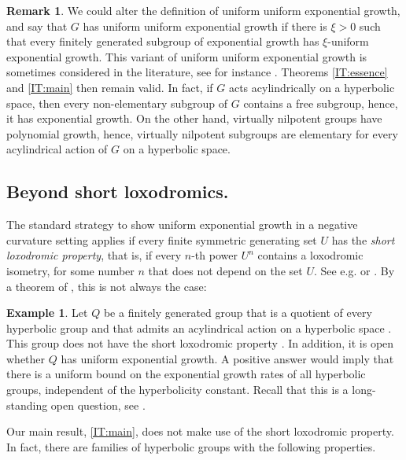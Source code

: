 \documentclass[leqno,a4paper,10pt]{amsart}
\theoremstyle{plain}
\theoremstyle{definition}
\newtheorem{ex}[thm]{Example}
\newtheorem{rem}[thm]{Remark}
\theoremstyle{remark}
\begin{document}
\begin{rem} We could alter the definition of uniform uniform exponential growth, and say that $G$ has uniform uniform exponential growth if there is $\xi>0$ such that every finitely generated subgroup of exponential growth has $\xi$-uniform exponential growth. This variant of uniform uniform exponential growth is sometimes considered in the literature, see for instance \cite{cui_lower_2022,kropholler_extensions_2020}. Theorems \ref{IT:essence} and \ref{IT:main} then remain valid. In fact, if $G$ acts acylindrically on a hyperbolic space, then every non-elementary subgroup of $G$ contains a free subgroup, hence, it has exponential growth. On the other hand, virtually nilpotent groups have polynomial growth, hence, virtually nilpotent subgroups are elementary for every acylindrical action of $G$ on a hyperbolic space.  
\end{rem}

\subsection{Beyond short loxodromics.}
The standard strategy to show uniform exponential growth in a negative curvature setting applies if every finite symmetric generating set $U$  has the \emph{short loxodromic property}, that is, if every $n$-th power $U^n$ contains a loxodromic isometry, for some number $n$ that does not depend on the set $U$. See e.g. \cite{koubi_croissance_1998} or \cite{mangahas_uniform_2010}. By  a theorem of \cite{minasyan_acylindrically_2019}, this is not always the case: 
\begin{ex}\label{IE:osin}
Let $Q$ be a finitely generated group that is a quotient of every hyperbolic group and that admits an acylindrical action on a hyperbolic space \cite[Theorem 1.1]{minasyan_acylindrically_2019}. This group does not have the short loxodromic property \cite[Corollary 1.4]{minasyan_acylindrically_2019}. In addition, it is open whether $Q$ has uniform exponential growth. A positive answer would imply that there is a uniform bound on the exponential growth rates of all hyperbolic groups, independent of the hyperbolicity constant. Recall that this is a long-standing open question, see  \cite[Question~2.1]{osin_algebraic_2004}\cite[Section~14, Question~2]{breuillard_joint_2021}.
\end{ex}
Our main result, \autoref{IT:main}, does not make use of the short loxodromic property. In fact, there are families of hyperbolic groups with the following properties. 
\end{document}

